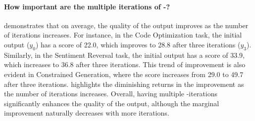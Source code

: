 \paragraph{How important are the multiple iterations of \fbmod-\itermod?}
 demonstrates that 
on average, the quality of the output improves as the number of iterations increases. 
For instance, in the Code Optimization task, the initial output ($y_0$) has a score of 22.0, which improves to 28.8 after three iterations ($y_3$). Similarly, in the Sentiment Reversal task, the initial output has a score of 33.9, which increases to 36.8 after three iterations. This trend of improvement is also evident in Constrained Generation, where the score increases from 29.0 to 49.7 after three iterations.
 highlights the diminishing returns in the improvement as the number of iterations increases. Overall, having multiple \fbmod-\itermod iterations significantly enhances the quality of the output, although the marginal improvement naturally decreases with more iterations. 

